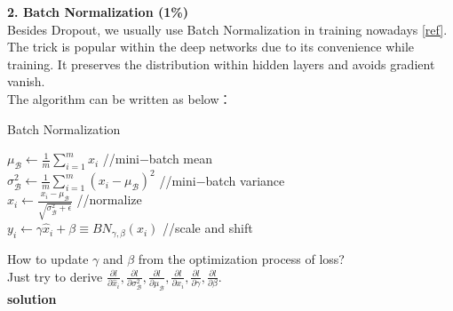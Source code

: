 \documentclass{article}
\begin{document}
\bigskip

\noindent
{\bf \Large 2. Batch Normalization (1\%)}\\

Besides Dropout, we usually use Batch Normalization in training nowadays \href{https://arxiv.org/pdf/1502.03167.pdf}{[ref]}. The trick is popular within the deep networks due to its convenience while training. It preserves the distribution within hidden layers and avoids gradient vanish.\\

The algorithm can be written as below：\\

\begin{algorithm}[H]
    \caption{Batch Normalization}
    \SetAlgoLined
    $\mu_{\mathcal B} \leftarrow \frac{1}{m} \sum^m_{i = 1} x_i$ //mini−batch mean\\
    $\sigma^2_{\mathcal B} \leftarrow \frac{1}{m} \sum^m_{i = 1} (x_i − \mu_{\mathcal B})^2$ //mini−batch variance\\
    ${\hat x}_i \leftarrow \frac{x_i − \mu_{\mathcal B}}{\sqrt{\sigma^2_{\mathcal B} + \epsilon}}$ //normalize\\
    $y_i \leftarrow \gamma {\hat x}_i + \beta \equiv BN_{\gamma, \beta}(x_i)$ //scale and shift\\
\end{algorithm}

\bigskip

How to update $\gamma$ and $\beta$ from the optimization process of loss?\\

Just try to derive $\frac{\partial l}{\partial {\hat x}_i}, \frac{\partial l}{\partial \sigma^2_{\mathcal B}}, \frac{\partial l}{\partial \mu_{\mathcal B}}, \frac{\partial l}{\partial x_i}, \frac{\partial l}{\partial \gamma}, \frac{\partial l}{\partial \beta}$.\\

\noindent
{\bf \large solution}\\
\end{document}
